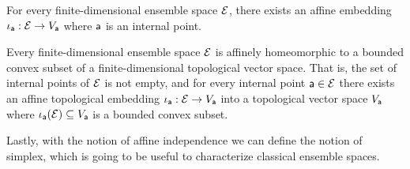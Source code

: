 \begin{coro}
	For every finite-dimensional ensemble space $\Ens$, there exists an affine embedding $\iota_{\ens[a]} : \Ens \to V_{\ens[a]}$ where $\ens[a]$ is an internal point.
\end{coro}

\begin{conj}
	Every finite-dimensional ensemble space $\Ens$ is affinely homeomorphic to a bounded convex subset of a finite-dimensional topological vector space. That is, the set of internal points of $\Ens$ is not empty, and for every internal point $\ens[a] \in \Ens$ there exists an affine topological embedding $\iota_{\ens[a]} : \Ens \to V_{\ens[a]}$ into a topological vector space $V_{\ens[a]}$ where $\iota_{\ens[a]}(\Ens) \subseteq V_{\ens[a]}$ is a bounded convex subset.
\end{conj}

Lastly, with the notion of affine independence we can define the notion of simplex, which is going to be useful to characterize classical ensemble spaces.

